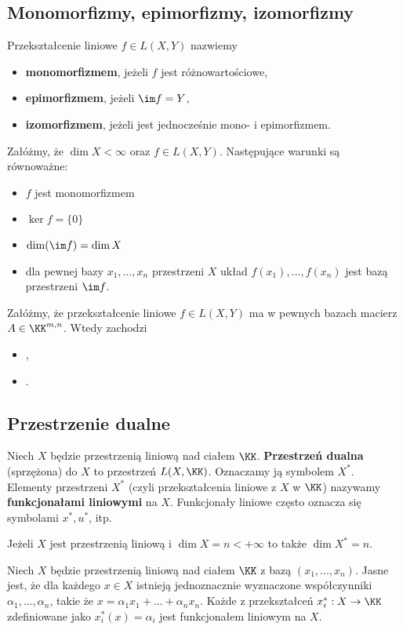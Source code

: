 \subsection{Monomorfizmy, epimorfizmy, izomorfizmy}
Przekształcenie liniowe $f\in L(X,Y)$ nazwiemy \begin{itemize}
    \item \textbf{monomorfizmem}, jeżeli $f$ jest różnowartościowe,
    \item \textbf{epimorfizmem}, jeżeli $\im f = Y$,
    \item \textbf{izomorfizmem}, jeżeli jest jednocześnie mono- i epimorfizmem.
\end{itemize}
Załóżmy, że $\dim X < \infty$ oraz $f\in L(X,Y)$. Następujące warunki są równoważne:
\begin{itemize}
    \item $f$ jest monomorfizmem
    \item $\ker f = \{ 0 \}$
    \item $\dim(\im f) = \dim X$
    \item dla pewnej bazy $x_1,\dots, x_n$ przestrzeni $X$ układ $f(x_1), \dots, f(x_n)$ jest bazą przestrzeni $\im f$.
\end{itemize}
Załóżmy, że przekształcenie liniowe $f\in L(X,Y)$ ma w pewnych bazach macierz $A\in\KK^{m,n}$. Wtedy zachodzi
\begin{itemize}
    \item {},
    \item {}.
\end{itemize}

\subsection{Przestrzenie dualne}

Niech $X$ będzie przestrzenią liniową nad ciałem $\KK$. \textbf{Przestrzeń dualna} (sprzężona) do $X$ to przestrzeń $L(X,\KK)$. Oznaczamy ją symbolem $X^*$. Elementy przestrzeni $X^*$ (czyli przekształcenia liniowe z $X$ w $\KK$) nazywamy \textbf{funkcjonałami liniowymi} na $X$. Funkcjonały liniowe często oznacza się symbolami $x^*, u^*$, itp.

Jeżeli $X$ jest przestrzenią liniową i $\dim X = n < +\infty$ to także $\dim X^*=n$.
\bigskip

Niech $X$ będzie przestrzenią liniową nad ciałem $\KK$ z bazą $(x_1, ..., x_n)$. Jasne jest, że dla każdego $x \in X$ istnieją jednoznacznie wyznaczone współczynniki $\alpha_1, ..., \alpha_n$, takie że $x = \alpha_1 x_1 + ... + \alpha_n x_n$. Każde z przekształceń $x_i^* : X \to \KK$ zdefiniowane jako $x_i^*(x) = \alpha_i$ jest funkcjonałem liniowym na $X$.


